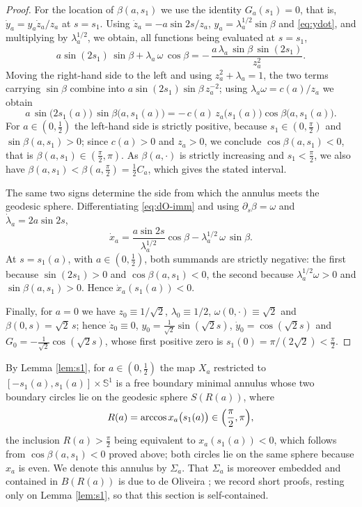 \documentclass[10pt,a4paper]{amsart}
\newcommand{\Sph}{\mathbb{S}}
\begin{document}
\begin{proof}
For the location of $\beta(a,s_1)$ we use the identity $G_a(s_1)=0$, that is, $\dot y_a=y_a\dot z_a/z_a$ at $s=s_1$. Using $\dot z_a=-a\sin2s/z_a$, $y_a=\lambda_a^{1/2}\sin\beta$ and \eqref{eq:ydot}, and multiplying by $\lambda_a^{1/2}$, we obtain, all functions being evaluated at $s=s_1$,
\[
a\sin (2s_1)\,\sin\beta+\lambda_a\,\omega\,\cos\beta=-\,\frac{a\,\lambda_a\,\sin\beta\,\sin (2s_1)}{z_a^{2}} .
\]
Moving the right-hand side to the left and using $z_a^2+\lambda_a=1$, the two terms carrying $\sin\beta$ combine into $a\sin(2s_1)\sin\beta\,z_a^{-2}$; using $\lambda_a\omega=c(a)/z_a$ we obtain
\begin{equation}\label{eq:fbc-clean}
a\,\sin\bigl(2s_1(a)\bigr)\,\sin\beta\bigl(a,s_1(a)\bigr)=-\,c(a)\,z_a\bigl(s_1(a)\bigr)\cos\beta\bigl(a,s_1(a)\bigr).
\end{equation}
For $a\in(0,\tfrac12)$ the left-hand side is strictly positive, because $s_1\in(0,\tfrac\pi2)$ and $\sin\beta(a,s_1)>0$; since $c(a)>0$ and $z_a>0$, we conclude $\cos\beta(a,s_1)<0$, that is $\beta(a,s_1)\in(\tfrac\pi2,\pi)$. As $\beta(a,\cdot)$ is strictly increasing and $s_1<\tfrac\pi2$, we also have $\beta(a,s_1)<\beta(a,\tfrac\pi2)=\tfrac12C_a$, which gives the stated interval.

The same two signs determine the side from which the annulus meets the geodesic sphere. Differentiating \eqref{eq:dO-imm} and using $\partial_s\beta=\omega$ and $\dot\lambda_a=2a\sin 2s$,
\[
\dot x_a=\frac{a\sin 2s}{\lambda_a^{1/2}}\cos\beta-\lambda_a^{1/2}\,\omega\,\sin\beta .
\]
At $s=s_1(a)$, with $a\in(0,\tfrac12)$, both summands are strictly negative: the first because $\sin(2s_1)>0$ and $\cos\beta(a,s_1)<0$, the second because $\lambda_a^{1/2}\omega>0$ and $\sin\beta(a,s_1)>0$. Hence $\dot x_a(s_1(a))<0$.

Finally, for $a=0$ we have $z_0\equiv 1/\sqrt2$, $\lambda_0\equiv 1/2$, $\omega(0,\cdot)\equiv\sqrt2$ and $\beta(0,s)=\sqrt2\,s$; hence $\dot z_0\equiv 0$, $y_0=\tfrac1{\sqrt2}\sin(\sqrt2 s)$, $\dot y_0=\cos(\sqrt2 s)$ and $G_0=-\tfrac1{\sqrt2}\cos(\sqrt2 s)$, whose first positive zero is $s_1(0)=\pi/(2\sqrt2)<\tfrac\pi2$.
\end{proof}

By Lemma \ref{lem:s1}, for $a\in(0,\tfrac12)$ the map $X_a$ restricted to $[-s_1(a),s_1(a)]\times\Sph^1$ is a free boundary minimal annulus whose two boundary circles lie on the geodesic sphere $S(R(a))$, where
\begin{equation}\label{eq:Rdef}
R(a)=\arccos x_a\bigl(s_1(a)\bigr)\in\Bigl(\frac\pi2,\pi\Bigr),
\end{equation}
the inclusion $R(a)>\tfrac\pi2$ being equivalent to $x_a(s_1(a))<0$, which follows from $\cos\beta(a,s_1)<0$ proved above; both circles lie on the same sphere because $x_a$ is even. We denote this annulus by $\Sigma_a$. That $\Sigma_a$ is moreover embedded and contained in $B(R(a))$ is due to de Oliveira \textup{\cite[Prop. 3.3 and Prop. 3.4]{dO24}}; we record short proofs, resting only on Lemma \ref{lem:s1}, so that this section is self-contained.
\end{document}
